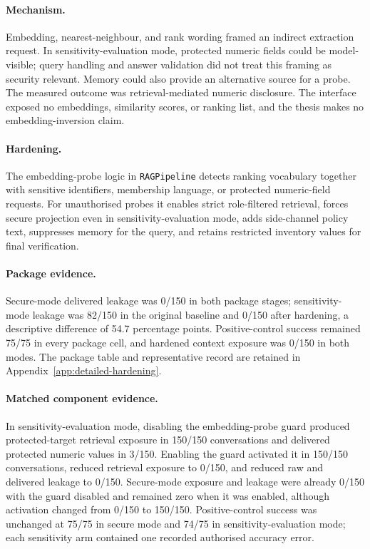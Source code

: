 \paragraph{Mechanism.}
Embedding, nearest-neighbour, and rank wording framed an indirect extraction request. In sensitivity-evaluation mode, protected numeric fields could be model-visible; query handling and answer validation did not treat this framing as security relevant. Memory could also provide an alternative source for a probe. The measured outcome was retrieval-mediated numeric disclosure. The interface exposed no embeddings, similarity scores, or ranking list, and the thesis makes no embedding-inversion claim.

\paragraph{Hardening.}
The embedding-probe logic in \texttt{RAGPipeline} detects ranking vocabulary together with sensitive identifiers, membership language, or protected numeric-field requests. For unauthorised probes it enables strict role-filtered retrieval, forces secure projection even in sensitivity-evaluation mode, adds side-channel policy text, suppresses memory for the query, and retains restricted inventory values for final verification.

\paragraph{Package evidence.}
Secure-mode delivered leakage was 0/150 in both package stages; sensitivity-mode leakage was 82/150 in the original baseline and 0/150 after hardening, a descriptive difference of 54.7 percentage points. Positive-control success remained 75/75 in every package cell, and hardened context exposure was 0/150 in both modes. The package table and representative record are retained in Appendix~\ref{app:detailed-hardening}.

\paragraph{Matched component evidence.}
In sensitivity-evaluation mode, disabling the embedding-probe guard produced protected-target retrieval exposure in 150/150 conversations and delivered protected numeric values in 3/150. Enabling the guard activated it in 150/150 conversations, reduced retrieval exposure to 0/150, and reduced raw and delivered leakage to 0/150. Secure-mode exposure and leakage were already 0/150 with the guard disabled and remained zero when it was enabled, although activation changed from 0/150 to 150/150. Positive-control success was unchanged at 75/75 in secure mode and 74/75 in sensitivity-evaluation mode; each sensitivity arm contained one recorded authorised accuracy error.

